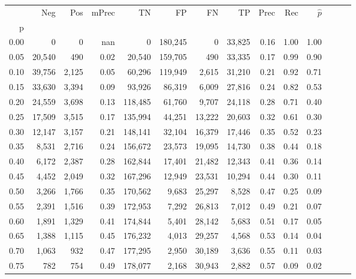 \begin{tabular}{rrrrrrrrrrrrrr}
\toprule
{} &     Neg &    Pos & mPrec &       TN &       FP &      FN &      TP &  Prec &   Rec & $\hat{p}$ \\
p    &         &        &       &          &          &         &         &       &       &           \\
\midrule
0.00 &       0 &      0 &   nan &        0 &  180,245 &       0 &  33,825 &  0.16 &  1.00 &      1.00 \\
0.05 &  20,540 &    490 &  0.02 &   20,540 &  159,705 &     490 &  33,335 &  0.17 &  0.99 &      0.90 \\
0.10 &  39,756 &  2,125 &  0.05 &   60,296 &  119,949 &   2,615 &  31,210 &  0.21 &  0.92 &      0.71 \\
0.15 &  33,630 &  3,394 &  0.09 &   93,926 &   86,319 &   6,009 &  27,816 &  0.24 &  0.82 &      0.53 \\
0.20 &  24,559 &  3,698 &  0.13 &  118,485 &   61,760 &   9,707 &  24,118 &  0.28 &  0.71 &      0.40 \\
0.25 &  17,509 &  3,515 &  0.17 &  135,994 &   44,251 &  13,222 &  20,603 &  0.32 &  0.61 &      0.30 \\
0.30 &  12,147 &  3,157 &  0.21 &  148,141 &   32,104 &  16,379 &  17,446 &  0.35 &  0.52 &      0.23 \\
0.35 &   8,531 &  2,716 &  0.24 &  156,672 &   23,573 &  19,095 &  14,730 &  0.38 &  0.44 &      0.18 \\
0.40 &   6,172 &  2,387 &  0.28 &  162,844 &   17,401 &  21,482 &  12,343 &  0.41 &  0.36 &      0.14 \\
0.45 &   4,452 &  2,049 &  0.32 &  167,296 &   12,949 &  23,531 &  10,294 &  0.44 &  0.30 &      0.11 \\
0.50 &   3,266 &  1,766 &  0.35 &  170,562 &    9,683 &  25,297 &   8,528 &  0.47 &  0.25 &      0.09 \\
0.55 &   2,391 &  1,516 &  0.39 &  172,953 &    7,292 &  26,813 &   7,012 &  0.49 &  0.21 &      0.07 \\
0.60 &   1,891 &  1,329 &  0.41 &  174,844 &    5,401 &  28,142 &   5,683 &  0.51 &  0.17 &      0.05 \\
0.65 &   1,388 &  1,115 &  0.45 &  176,232 &    4,013 &  29,257 &   4,568 &  0.53 &  0.14 &      0.04 \\
0.70 &   1,063 &    932 &  0.47 &  177,295 &    2,950 &  30,189 &   3,636 &  0.55 &  0.11 &      0.03 \\
0.75 &     782 &    754 &  0.49 &  178,077 &    2,168 &  30,943 &   2,882 &  0.57 &  0.09 &      0.02 \\

\end{tabular}
